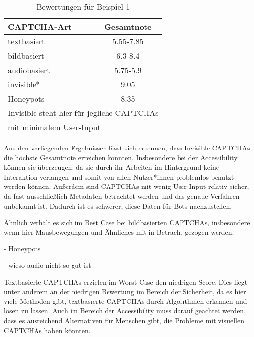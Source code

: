 \begin{table}[h!]
    \caption{Bewertungen für Beispiel 1}
    \begin{center}
        \begin{tabular}{l|c}
            CAPTCHA-Art                       & Gesamtnote \\\hline
            textbasiert            &  5.55-7.85       \\
            bildbasiert                   &  6.3-8.4      \\
            audiobasiert        & 5.75-5.9         \\
            invisible*                      & 9.05         \\
            Honeypots       & 8.35\\
            \multicolumn{2}{l}{\footnotesize * Invisible steht hier für jegliche CAPTCHAs} \\
            \multicolumn{2}{l}{\footnotesize \space \space mit minimalem User-Input}
        \end{tabular}
    \end{center}
\end{table}

Aus den vorliegenden Ergebnissen lässt sich erkennen, dass Invisible CAPTCHAs die höchste Gesamtnote erreichen konnten.
Insbesondere bei der Accessibility können sie überzeugen, 
da sie durch ihr Arbeiten im Hintergrund keine Interaktion verlangen und somit von allen Nutzer*innen problemlos benutzt werden können.
Außerdem sind CAPTCHAs mit wenig User-Input relativ sicher, da fast ausschließlich Metadaten betrachtet werden und das genaue Verfahren unbekannt ist.
Dadurch ist es schwerer, diese Daten für Bots nachzustellen.

Ähnlich verhält es sich im Best Case bei bildbasierten CAPTCHAs, insbesondere wenn hier Mausbewegungen und Ähnliches mit in Betracht gezogen werden.



- Honeypots

- wieso audio nicht so gut ist

Textbasierte CAPTCHAs erzielen im Worst Case den niedrigen Score.
Dies liegt unter anderem an der niedrigen Bewertung im Bereich der Sicherheit, 
da es hier viele Methoden gibt, textbasierte CAPTCHAs durch Algorithmen erkennen und lösen zu lassen.
Auch im Bereich der Accessibility muss darauf geachtet werden, dass es ausreichend Alternativen für Menschen gibt,
die Probleme mit visuellen CAPTCHAs haben könnten.

